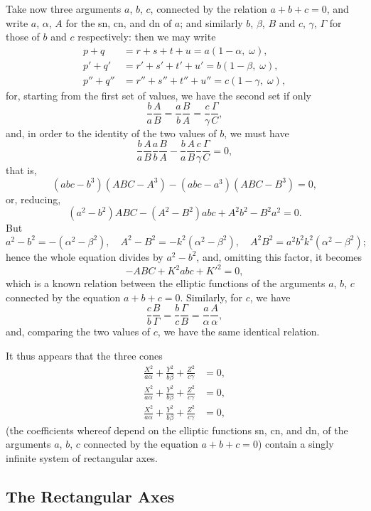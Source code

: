 \documentclass[11pt,a4paper]{article}
\theoremstyle{cayley}
\begin{document}
Take now three arguments $a$, $b$, $c$, connected by the relation $a+b+c=0$, and write $a$, $\alpha$, $A$ for the sn, cn, and dn of $a$; and similarly $b$, $\beta$, $B$ and $c$, $\gamma$, $\Gamma$ for those of $b$ and $c$ respectively: then we may write
\begin{align*}
p+q &= r+s+t+u = a(1-\alpha,\; \omega),\\
p'+q' &= r'+s'+t'+u' = b(1-\beta,\; \omega),\\
p''+q'' &= r''+s''+t''+u'' = c(1-\gamma,\; \omega),
\end{align*}
for, starting from the first set of values, we have the second set if only
\[
\frac{b}{a}\frac{A}{B} = \frac{a}{b}\frac{B}{A} = \frac{c}{\gamma}\frac{\Gamma}{C},
\]
and, in order to the identity of the two values of $b$, we must have
\[
\frac{b}{a}\frac{A}{B}\frac{a}{b}\frac{B}{A} - \frac{b}{a}\frac{A}{B}\frac{c}{\gamma}\frac{\Gamma}{C} = 0,
\]
that is,
\[
(abc - b^{3})(ABC - A^{3}) - (abc - a^{3})(ABC - B^{3}) = 0,
\]
or, reducing,
\[
(a^{2} - b^{2})ABC - (A^{2} - B^{2})abc + A^{2}b^{2} - B^{2}a^{2} = 0.
\]
But
\[
a^{2} - b^{2} = -(\alpha^{2} - \beta^{2}),\quad A^{2} - B^{2} = -k^{2}(\alpha^{2} - \beta^{2}),\quad A^{2}B^{2} = a^{2}b^{2}k^{2}(\alpha^{2} - \beta^{2});
\]
hence the whole equation divides by $a^{2} - b^{2}$, and, omitting this factor, it becomes
\[
-ABC + K^{2}abc + K'^{2} = 0,
\]
which is a known relation between the elliptic functions of the arguments $a$, $b$, $c$ connected by the equation $a+b+c=0$. Similarly, for $c$, we have
\[
\frac{c}{b}\frac{B}{\Gamma} = \frac{b}{c}\frac{\Gamma}{B} = \frac{a}{\alpha}\frac{A}{\alpha},
\]
and, comparing the two values of $c$, we have the same identical relation.

It thus appears that the three cones
\begin{align*}
\frac{X^{2}}{a\alpha} + \frac{Y^{2}}{b\beta} + \frac{Z^{2}}{c\gamma} &= 0,\\
\frac{X^{2}}{a\alpha} + \frac{Y^{2}}{b\beta} + \frac{Z^{2}}{c\gamma} &= 0,\\
\frac{X^{2}}{a\alpha} + \frac{Y^{2}}{b\beta} + \frac{Z^{2}}{c\gamma} &= 0,
\end{align*}
(the coefficients whereof depend on the elliptic functions sn, cn, and dn, of the arguments $a$, $b$, $c$ connected by the equation $a+b+c=0$) contain a singly infinite system of rectangular axes.

\subsection*{The Rectangular Axes}
\end{document}
